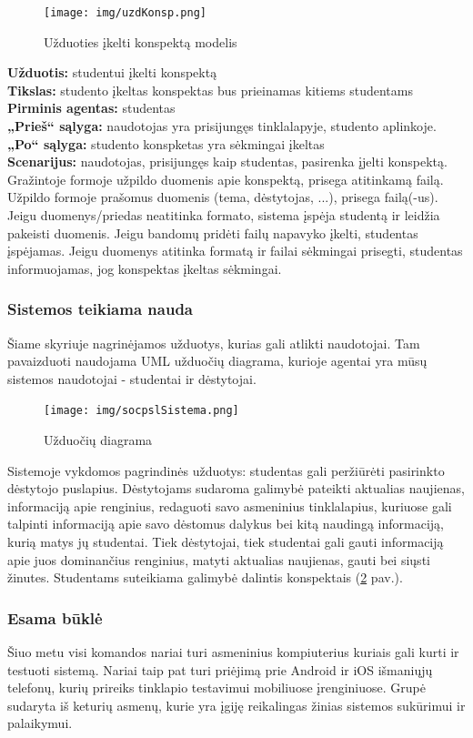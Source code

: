\documentclass{VUMIFPSkursinis}
\begin{document}
\begin{figure}[H]
\centering
\texttt{[image: img/uzdKonsp.png]}
\caption{Užduoties įkelti konspektą modelis}
\label{fig:konspektas}
\end{figure}
\textbf{Užduotis: } studentui įkelti konspektą\\
\textbf{Tikslas: } studento įkeltas konspektas bus prieinamas kitiems studentams\\
\textbf{Pirminis agentas: } studentas\\
\textbf{„Prieš“ sąlyga: } naudotojas yra prisijungęs tinklalapyje, studento aplinkoje.\\
\textbf{„Po“ sąlyga: } studento konspketas yra sėkmingai įkeltas\\
\textbf{Scenarijus: } naudotojas, prisijungęs kaip studentas, pasirenka įjelti konspektą. Gražintoje formoje užpildo duomenis apie konspektą, prisega atitinkamą failą. Užpildo formoje prašomus duomenis (tema, dėstytojas, ...), prisega failą(-us). Jeigu duomenys/priedas neatitinka formato, sistema įspėja studentą ir leidžia pakeisti duomenis. Jeigu bandomų pridėti failų napavyko įkelti, studentas įspėjamas. Jeigu duomenys atitinka formatą ir failai sėkmingai prisegti, studentas informuojamas, jog konspektas įkeltas sėkmingai.
\endgroup
\subsubsection{Sistemos teikiama nauda}
Šiame skyriuje nagrinėjamos užduotys, kurias gali atlikti naudotojai. Tam pavaizduoti naudojama UML užduočių diagrama, kurioje agentai yra mūsų sistemos naudotojai - studentai ir dėstytojai.
\begin{figure}[H]
\centering
\texttt{[image: img/socpslSistema.png]}
\caption{Užduočių diagrama}
\label{fig:uzdDiagram}
\end{figure}
Sistemoje vykdomos pagrindinės užduotys: studentas gali peržiūrėti pasirinkto dėstytojo puslapius. Dėstytojams sudaroma galimybė pateikti aktualias naujienas, informaciją apie renginius, redaguoti savo asmeninius tinklalapius, kuriuose gali talpinti informaciją apie savo dėstomus dalykus bei kitą naudingą informaciją, kurią matys jų studentai. Tiek dėstytojai, tiek studentai gali gauti informaciją apie juos dominančius renginius, matyti aktualias naujienas, gauti bei siųsti žinutes. Studentams suteikiama galimybė dalintis konspektais (\ref{fig:uzdDiagram} pav.).
\subsubsection{Esama būklė}
Šiuo metu visi komandos nariai turi asmeninius kompiuterius kuriais gali kurti ir testuoti sistemą. Nariai taip pat turi priėjimą prie Android ir iOS išmaniųjų telefonų, kurių prireiks tinklapio testavimui mobiliuose įrenginiuose. Grupė sudaryta iš keturių asmenų, kurie yra įgiję reikalingas žinias sistemos sukūrimui ir palaikymui.
\end{document}
